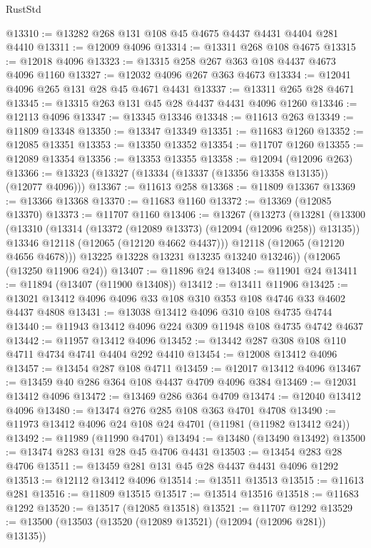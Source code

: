 \begin{lexlean}{RustStd}
\begin{coremodule}
@13310 := @13282 @268 @131 @108 @45 @4675 @4437 @4431 @4404 @281 @4410
@13311 := @12009 @4096
@13314 := @13311 @268 @108 @4675
@13315 := @12018 @4096
@13323 := @13315 @258 @267 @363 @108 @4437 @4673 @4096 @1160
@13327 := @12032 @4096 @267 @363 @4673
@13334 := @12041 @4096 @265 @131 @28 @45 @4671 @4431
@13337 := @13311 @265 @28 @4671
@13345 := @13315 @263 @131 @45 @28 @4437 @4431 @4096 @1260
@13346 := @12113 @4096
@13347 := @13345 @13346
@13348 := @11613 @263
@13349 := @11809 @13348
@13350 := @13347 @13349
@13351 := @11683 @1260
@13352 := @12085 @13351
@13353 := @13350 @13352
@13354 := @11707 @1260
@13355 := @12089 @13354
@13356 := @13353 @13355
@13358 := @12094 (@12096 @263)
@13366 := @13323 (@13327 (@13334 (@13337 (@13356 @13358 @13135)) (@12077 @4096)))
@13367 := @11613 @258
@13368 := @11809 @13367
@13369 := @13366 @13368
@13370 := @11683 @1160
@13372 := @13369 (@12085 @13370)
@13373 := @11707 @1160
@13406 := @13267
    (@13273
      (@13281
        (@13300
          (@13310
            (@13314 (@13372 (@12089 @13373) (@12094 (@12096 @258)) @13135))
            @13346
            @12118
            (@12065 (@12120 @4662 @4437)))
          @12118
          (@12065 (@12120 @4656 @4678)))
        @13225
        @13228
        @13231
        @13235
        @13240
        @13246))
    (@12065 (@13250 @11906 @24))
@13407 := @11896 @24
@13408 := @11901 @24
@13411 := @11894 (@13407 (@11900 @13408))
@13412 := @13411 @11906
@13425 := @13021 @13412 @4096 @4096 @33 @108 @310 @353 @108 @4746 @33 @4602 @4437 @4808
@13431 := @13038 @13412 @4096 @310 @108 @4735 @4744
@13440 := @11943 @13412 @4096 @224 @309 @11948 @108 @4735 @4742 @4637
@13442 := @11957 @13412 @4096
@13452 := @13442 @287 @308 @108 @110 @4711 @4734 @4741 @4404 @292 @4410
@13454 := @12008 @13412 @4096
@13457 := @13454 @287 @108 @4711
@13459 := @12017 @13412 @4096
@13467 := @13459 @40 @286 @364 @108 @4437 @4709 @4096 @384
@13469 := @12031 @13412 @4096
@13472 := @13469 @286 @364 @4709
@13474 := @12040 @13412 @4096
@13480 := @13474 @276 @285 @108 @363 @4701 @4708
@13490 := @11973 @13412 @4096 @24 @108 @24 @4701 (@11981 (@11982 @13412 @24))
@13492 := @11989 (@11990 @4701)
@13494 := @13480 (@13490 @13492)
@13500 := @13474 @283 @131 @28 @45 @4706 @4431
@13503 := @13454 @283 @28 @4706
@13511 := @13459 @281 @131 @45 @28 @4437 @4431 @4096 @1292
@13513 := @12112 @13412 @4096
@13514 := @13511 @13513
@13515 := @11613 @281
@13516 := @11809 @13515
@13517 := @13514 @13516
@13518 := @11683 @1292
@13520 := @13517 (@12085 @13518)
@13521 := @11707 @1292
@13529 := @13500 (@13503 (@13520 (@12089 @13521) (@12094 (@12096 @281)) @13135))

\end{coremodule}
\end{lexlean}
